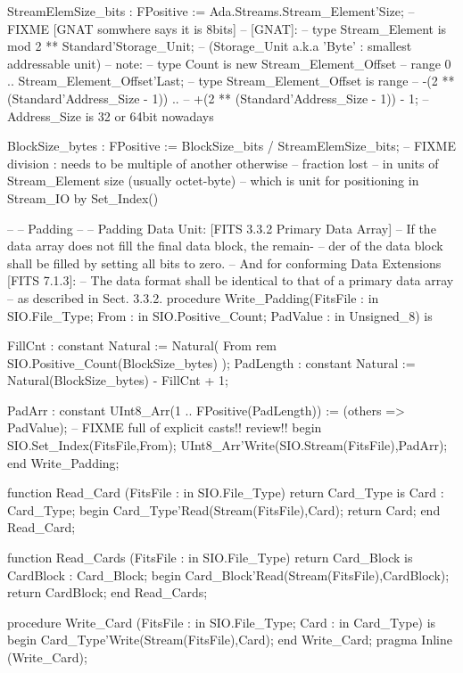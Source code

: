    StreamElemSize_bits : FPositive := Ada.Streams.Stream_Element'Size;
    -- FIXME [GNAT somwhere says it is 8bits]
    -- [GNAT]:
    --  type Stream_Element is mod 2 ** Standard'Storage_Unit;
    -- (Storage_Unit a.k.a 'Byte' : smallest addressable unit)
    -- note:
    --  type Count is new Stream_Element_Offset
    --                range 0 .. Stream_Element_Offset'Last;
    --  type Stream_Element_Offset is range
    --               -(2 ** (Standard'Address_Size - 1)) ..
    --               +(2 ** (Standard'Address_Size - 1)) - 1;
    -- Address_Size is 32 or 64bit nowadays

   BlockSize_bytes : FPositive := BlockSize_bits / StreamElemSize_bits;
   -- FIXME division : needs to be multiple of another otherwise
   --                  fraction lost
   -- in units of Stream_Element size (usually octet-byte)
   -- which is unit for positioning in Stream_IO by Set_Index()

   --
   -- Padding
   --
   -- Padding Data Unit: [FITS 3.3.2 Primary Data Array]
   -- If the data array does not fill the final data block, the remain-
   -- der of the data block shall be filled by setting all bits to zero.
   -- And for conforming Data Extensions [FITS 7.1.3]:
   -- The data format shall be identical to that of a primary data array
   -- as described in Sect. 3.3.2.
   procedure Write_Padding(FitsFile : in SIO.File_Type;
                           From     : in SIO.Positive_Count;
                           PadValue : in Unsigned_8)
   is

    FillCnt   : constant Natural :=
       Natural( From rem SIO.Positive_Count(BlockSize_bytes) );
    PadLength : constant Natural :=
       Natural(BlockSize_bytes) - FillCnt + 1;

    PadArr    : constant UInt8_Arr(1 .. FPositive(PadLength)) := (others => PadValue);
    -- FIXME full of explicit casts!! review!!
   begin
    SIO.Set_Index(FitsFile,From);
    UInt8_Arr'Write(SIO.Stream(FitsFile),PadArr);
   end Write_Padding;


   function  Read_Card  (FitsFile  : in  SIO.File_Type)
     return Card_Type
   is
     Card : Card_Type;
   begin
     Card_Type'Read(Stream(FitsFile),Card);
     return Card;
   end Read_Card;

   function  Read_Cards (FitsFile  : in  SIO.File_Type)
     return Card_Block
   is
     CardBlock : Card_Block;
   begin
     Card_Block'Read(Stream(FitsFile),CardBlock);
     return CardBlock;
   end Read_Cards;

   procedure Write_Card  (FitsFile : in SIO.File_Type;
                          Card     : in Card_Type)
   is
   begin
     Card_Type'Write(Stream(FitsFile),Card);
   end Write_Card;
   pragma Inline (Write_Card);

